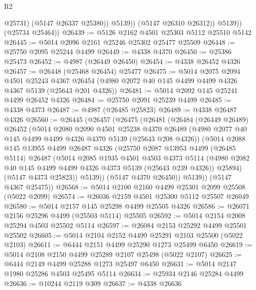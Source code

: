\begin{lexlean}{R2}
\begin{coremodule}
                    @25731)
                  (@5147 @26337 @25380))
                @5139))
            (@5147 @26310 @26312))
          @5139))
      (@25734 @25464))
@26439 := @5126 @2162 @4501 @25303 @5112 @25510 @5142
@26445 := @5014 @2096 @2161 @25246 @25302 @25477 @25509
@26448 := @25750 @2095 @25244 @4499
@26449 := @4338 @4370
@26450 := @25386 @25473
@26452 := @4987 (@26449 @26450)
@26454 := @4338 @26452 @4326
@26457 := @26448 (@25468 @26454) @25477
@26475 := @5014
    @2075
    @2094
    @4501
    @25243
    @4367
    @26454
    (@4980 @2072 @40 @145 @4499 @4499 @4326 @4367 @5139 (@25643 @201 @4326))
@26481 := @5014 @2092 @145 @25241 @4499 @26452 @4326
@26484 := @25750 @2091 @25239 @4499
@26485 := @4338 @4373
@26487 := @4987 (@26485 @25823)
@26489 := @4338 @26487 @4326
@26560 := @26445
    (@26457
      (@26475
        (@26481
          (@26484
            (@26449 @26489)
            @26452
            (@5014
              @2080
              @2090
              @4501
              @25238
              @4370
              @26489
              (@4980 @2077 @40 @145 @4499 @4499 @4326 @4370 @5139 (@25643 @208 @4326))
              (@5014
                @2088
                @145
                @13955
                @4499
                @26487
                @4326
                (@25750
                  @2087
                  @13953
                  @4499
                  (@26485 @5114)
                  @26487
                  (@5014
                    @2085
                    @1935
                    @4501
                    @4503
                    @4373
                    @5114
                    (@4980 @2082 @40 @145 @4499 @4499 @4326 @4373 @5139 (@25643 @239 @4326))
                    @25894)
                  (@5147 @4373 @25823))
                @5139))
            (@5147 @4370 @26450))
          @5139))
      (@5147 @4367 @25475))
@26568 := @5014 @2100 @2160 @4499 @25301 @2099 @25508 (@5022 @2099)
@26574 := @26036 @2159 @4501 @25300 @5112 @25507 @26049
@26580 := @5014 @2157 @145 @25298 @4499 @25505 @4326
@26586 := @26071 @2156 @25296 @4499 (@25503 @5114) @25505
@26592 := @5014 @2154 @2008 @25294 @4503 @25502 @5114
@26597 := @26084 @2153 @25292 @4499 @25501 @25502
@26605 := @5014 @2104 @2152 @4499 @25291 @2103 @25500 (@5022 @2103)
@26611 := @6444 @2151 @4499 @25290 @1273 @25499 @6450
@26619 := @5014 @2108 @2150 @4499 @25289 @2107 @25498 (@5022 @2107)
@26625 := @6444 @2149 @4499 @25288 @1273 @25497 @6450
@26631 := @5014 @2147 @1980 @25286 @4503 @25495 @5114
@26634 := @25934 @2146 @25284 @4499
@26636 := @10244 @2119 @309
@26637 := @4338 @26636

\end{coremodule}
\end{lexlean}
